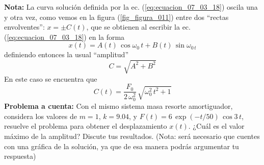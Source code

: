 \textbf{Nota:} La curva solución definida por la ec. (\ref{eq:ecuacion_07_03_18}) oscila una y otra vez, como vemos en la figura (\ref{fig_figura_011}) entre dos \enquote{rectas envolventes}: $x = \pm C(t)$, que se obtienen al escribir la ec. (\ref{eq:ecuacion_07_03_18}) en la forma
\[ x(t) =  A(t) \, \cos \omega_{0} \, t +  B(t) \, \sin \omega_{0 \, t} \]
definiendo entonces la usual \enquote{amplitud}
\[ C = \sqrt{A^{2} +  B^{2}} \]
En este caso se encuentra que
\[ C(t) = \dfrac{F_{0}}{2 \, \omega_{0}^{2}} \, \sqrt{\omega_{0}^{2} \, t^{2} + 1} \]
\textbf{Problema a cuenta: } Con el mismo sistema masa resorte amortiguador, considera los valores de $m = 1$, $k = 9.04$, y $F(t) =  6 \, \exp(-t/50) \, \cos 3 \, t$, resuelve el problema para obtener el desplazamiento $x(t)$. ¿Cuál es el valor máximo de la amplitud? Discute tus resultados. (Nota: será necesario que cuentes con una gráfica de la solución, ya que de esa manera podrás argumentar tu respuesta)
